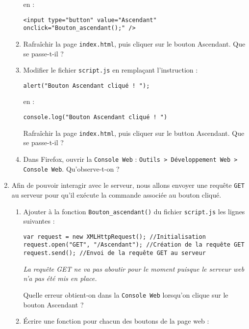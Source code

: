 \documentclass[a4paper]{article}
\begin{document}
\begin{enumerate}
\begin{enumerate}
	en : 

	\begin{verbatim}
<input type="button" value="Ascendant" onclick="Bouton_ascendant();" />
	\end{verbatim}

      \item Rafraîchir la page \verb|index.html|, puis cliquer sur le bouton \og{}Ascendant\fg{}. Que se passe-t-il ? 
      \item Modifier le fichier \verb|script.js| en remplaçant l'instruction : 

	\begin{verbatim}
alert("Bouton Ascendant cliqué ! ");
	\end{verbatim}

	en :

	\begin{verbatim}
console.log("Bouton Ascendant cliqué ! ")
	\end{verbatim}

	Rafraîchir la page \verb|index.html|, puis cliquer sur le button \og{}Ascendant\fg. Que se passe-t-il ?
      \item Dans Firefox, ouvrir la \verb|Console Web| : \verb|Outils > Développement Web > Console Web|. Qu'observe-t-on ?
    \end{enumerate}

    \pagebreak 

  \item Afin de pouvoir interagir avec le serveur, nous allons envoyer une requête \verb|GET| au serveur pour qu'il exécute la commande associée au bouton cliqué. 
    \begin{enumerate}
      \item Ajouter à la fonction \texttt{Bouton_ascendant()} du fichier \verb|script.js| les lignes suivantes : 

	\begin{verbatim}
var request = new XMLHttpRequest(); //Initialisation 
request.open("GET", "/Ascendant"); //Création de la requête GET
request.send(); //Envoi de la requête GET au serveur
	\end{verbatim}

	\textit{La requête GET ne va pas aboutir pour le moment puisque le serveur web n'a pas été mis en place.}

	Quelle erreur obtient-on dans la \verb|Console Web| lorsqu'on clique sur le bouton \og{}Ascendant\fg{} ?
      \item Écrire une fonction pour chacun des boutons de la page web : 


\end{enumerate}
\end{enumerate}
\end{document}
